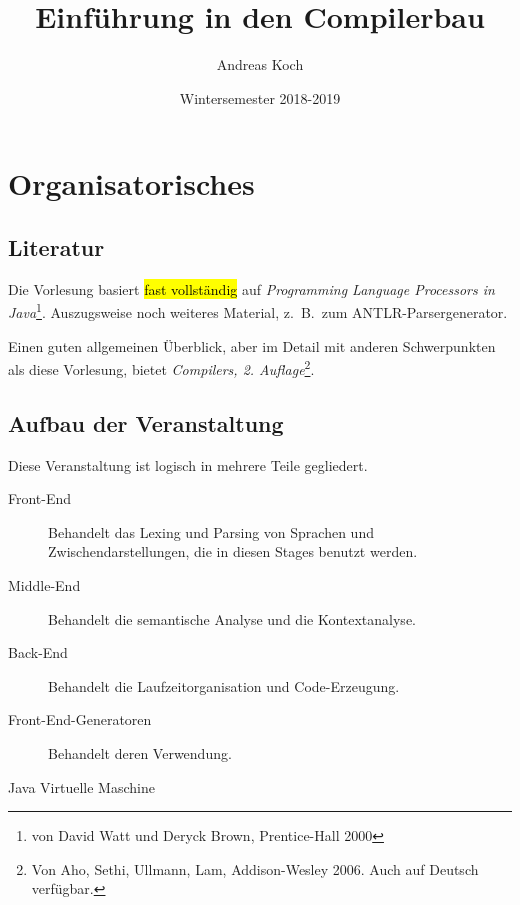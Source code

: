 \documentclass[ngerman,abstract=true]{scrartcl}
\title{Einführung in den Compilerbau}
\date{Wintersemester 2018-2019}
\author{Andreas Koch}
\begin{document}
\maketitle
  
\tableofcontents
\newpage
  
\section{Organisatorisches}
   
\subsection{Literatur}
 
Die Vorlesung basiert \hl{fast vollständig} auf \emph{Programming Language Processors in Java}\footnote{von David Watt und Deryck Brown, Prentice-Hall 2000}. Auszugsweise noch weiteres Material, z.\ B.\ zum ANTLR-Parsergenerator.

Einen guten allgemeinen Überblick, aber im Detail mit anderen Schwerpunkten als diese Vorlesung, bietet \emph{Compilers, 2. Auflage}\footnote{Von Aho, Sethi, Ullmann, Lam, Addison-Wesley 2006. Auch auf Deutsch verfügbar.}.
 
\subsection{Aufbau der Veranstaltung}

Diese Veranstaltung ist logisch in mehrere Teile gegliedert.

\begin{description}
  \item[Front-End\footnotemark] Behandelt das Lexing und Parsing von Sprachen und Zwischendarstellungen, die in diesen Stages benutzt werden.
  \item[Middle-End] Behandelt die semantische Analyse und die Kontextanalyse.
  \item[Back-End] Behandelt die Laufzeitorganisation und Code-Erzeugung.
  \item[Front-End-Generatoren] Behandelt deren Verwendung.
  \item[Java Virtuelle Maschine] 
\end{description}
\end{document}
